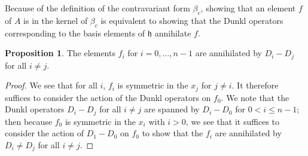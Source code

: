 \documentclass{amsart}
\numberwithin{equation}{section}
\theoremstyle{definition}
\newtheorem{proposition}[equation]{Proposition}
\newcommand{\h}{\mathfrak{h}}
\begin{document}
Because of the definition of the contravariant form $\beta_c$, showing that an element $f$ of $A$ is in the kernel of $\beta_c$ is equivalent to showing that the Dunkl operators corresponding to the basis elements of $\h$ annihilate $f$.

\begin{proposition}\label{prop:ann} The elements $f_i$ for $i=0,\dots,n-1$ are annihilated by $D_i-D_j$ for all $i \ne j$.
\end{proposition}

\begin{proof}

We see that for all $i$, $f_i$ is symmetric in the $x_j$ for $j \ne i$. It therefore suffices to consider the action of the Dunkl operators on $f_0$. We note that the Dunkl operators $D_i-D_j$ for all $i \ne j$ are spanned by $D_i-D_0$ for $0<i \le n-1$; then because $f_0$ is symmetric in the $x_i$ with $i > 0$, we see that it suffices to consider the action of $D_1-D_0$ on $f_0$ to show that the $f_i$ are annihilated by $D_i \ne D_j$ for all $i \ne j$. 


\end{proof}
\end{document}
